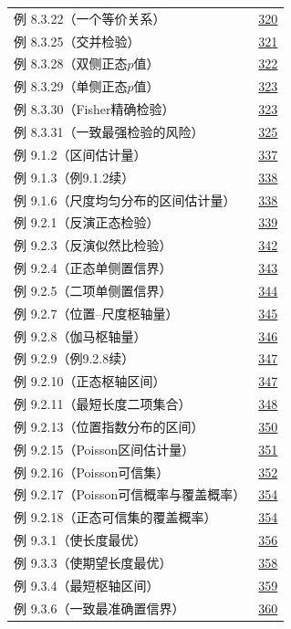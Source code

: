 \begin{longtable}{@{}p{}r@{}}
例 8.3.22（一个等价关系） & \hyperref[ex:8.3.22]{320} \\
例 8.3.25（交并检验） & \hyperref[ex:8.3.25]{321} \\
例 8.3.28（双侧正态$p$值） & \hyperref[ex:8.3.28]{322} \\
例 8.3.29（单侧正态$p$值） & \hyperref[ex:8.3.29]{323} \\
例 8.3.30（Fisher精确检验） & \hyperref[ex:8.3.30]{323} \\
例 8.3.31（一致最强检验的风险） & \hyperref[ex:8.3.31]{325} \\
\addlinespace[.5em]
例 9.1.2（区间估计量） & \hyperref[ex:9.1.2]{337} \\
例 9.1.3（例9.1.2续） & \hyperref[ex:9.1.3]{338} \\
例 9.1.6（尺度均匀分布的区间估计量） & \hyperref[ex:9.1.6]{338} \\
例 9.2.1（反演正态检验） & \hyperref[ex:9.2.1]{339} \\
例 9.2.3（反演似然比检验） & \hyperref[ex:9.2.3]{342} \\
例 9.2.4（正态单侧置信界） & \hyperref[ex:9.2.4]{343} \\
例 9.2.5（二项单侧置信界） & \hyperref[ex:9.2.5]{344} \\
例 9.2.7（位置–尺度枢轴量） & \hyperref[ex:9.2.7]{345} \\
例 9.2.8（伽马枢轴量） & \hyperref[ex:9.2.8]{346} \\
例 9.2.9（例9.2.8续） & \hyperref[ex:9.2.9]{347} \\
例 9.2.10（正态枢轴区间） & \hyperref[ex:9.2.10]{347} \\
例 9.2.11（最短长度二项集合） & \hyperref[ex:9.2.11]{348} \\
例 9.2.13（位置指数分布的区间） & \hyperref[ex:9.2.13]{350} \\
例 9.2.15（Poisson区间估计量） & \hyperref[ex:9.2.15]{351} \\
例 9.2.16（Poisson可信集） & \hyperref[ex:9.2.16]{352} \\
例 9.2.17（Poisson可信概率与覆盖概率） & \hyperref[ex:9.2.17]{354} \\
例 9.2.18（正态可信集的覆盖概率） & \hyperref[ex:9.2.18]{354} \\
例 9.3.1（使长度最优） & \hyperref[ex:9.3.1]{356} \\
例 9.3.3（使期望长度最优） & \hyperref[ex:9.3.3]{358} \\
例 9.3.4（最短枢轴区间） & \hyperref[ex:9.3.4]{359} \\
例 9.3.6（一致最准确置信界） & \hyperref[ex:9.3.6]{360} \\

\end{longtable}
